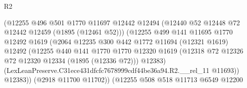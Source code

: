 \begin{lexlean}{R2}
\begin{coremodule}
                                        (@12255
                                          @496
                                          @501
                                          @1770
                                          @11697
                                          @12442
                                          @12494
                                          (@12440 @52 @12448 @72 @12442 @12459 (@1895 (@12461 @52)))
                                          (@12255
                                            @499
                                            @141
                                            @11695
                                            @1770
                                            @12492
                                            @1619
                                            (@2064
                                              @12235
                                              @300
                                              @442
                                              @1772
                                              @11694
                                              (@12321 @1619)
                                              @12492
                                              (@12255
                                                @440
                                                @141
                                                @1770
                                                @1770
                                                @12320
                                                @1619
                                                (@12318
                                                  @72
                                                  @12326
                                                  @72
                                                  @12320
                                                  @12334
                                                  (@1895 (@12336 @72)))
                                                @12383)
                                              (LexLeanPreserve.C31ece431dfcfc7678999cdf44be36a94.R2.__rel_11
                                                @11693))
                                            @12383))
                                        (@2918 @11700 @11702))
                                      (@12255
                                        @508
                                        @518
                                        @11713
                                        @6549
                                        @12200

\end{coremodule}
\end{lexlean}
